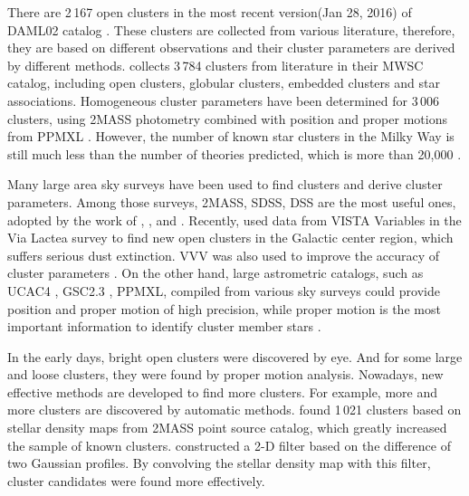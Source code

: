 \documentclass[]{raa_rb}
\begin{document}
There are 2\,167 open clusters in the most recent version(Jan 28, 2016) of DAML02 catalog \citep{Dias2002}. These clusters are collected from various literature, therefore, they are based on different observations and their cluster parameters are derived by different methods.  \cite{Kharchenko2012, Kharchenko2013} collects 3\,784 clusters from literature in their MWSC catalog, including open clusters, globular clusters, embedded clusters and star associations. Homogeneous cluster parameters have been determined for 3\,006 clusters, using 2MASS \citep{Skrutskie2006} photometry combined with position and proper motions from PPMXL \citep{Roser2010}.  However, the number of known star clusters in the Milky Way is still much less than the number of theories predicted, which is more than 20,000 \citep{Zwart2010, Bonatto2006}. 

Many large area sky surveys have been used to find clusters and derive cluster parameters. Among those surveys, 2MASS, SDSS, DSS are the most useful ones, adopted by the work of  \cite{Bonatto2006}, \cite{Bica2006}, \cite{An2009} and  \cite{Kronberger2006}. Recently, \cite{Borissova2011} used data from VISTA Variables in the Via Lactea survey \citep[VVV,][]{Minniti2010} to find new open clusters in the Galactic center region, which suffers serious dust extinction. VVV was also used to improve the accuracy of cluster parameters \citep{Majaess2012}. On the other hand, large astrometric catalogs, such as UCAC4 \citep{Zacharias2013}, GSC2.3 \citep{Lasker2008}, PPMXL\citep{Roser2010}, compiled from various sky surveys could provide position and proper motion of high precision, while proper motion is the most important information to identify cluster member stars \citep{Kharchenko2005}.

In the early days, bright open clusters were discovered by eye. And for some large and loose clusters, they were found by proper motion analysis. Nowadays, new effective methods are developed to find more clusters. For example, more and more clusters are discovered by automatic methods.  \cite{FSR2007} found 1\,021 clusters based on stellar density maps from 2MASS point source catalog, which greatly increased the sample of known clusters.  \cite{Koposov2008} constructed a 2-D filter based on the difference of two Gaussian profiles. By convolving the stellar density map with this filter, cluster candidates were found more effectively. 
\end{document}
